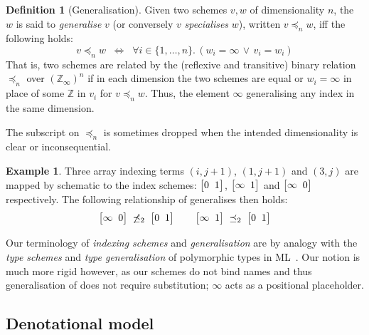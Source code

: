 \documentclass[9pt]{sigplanconf}
\newcounter{block}
\theoremstyle{definition}
\newtheorem{example}[block]{Example}
\newtheorem{definition}[block]{Definition}
\newcommand{\vtwoh}[2]{\setlength{\arraycolsep}{0em}
\left[\begin{array}{cc}#1 \; & \; #2\end{array}\right]}
\begin{document}
\begin{definition}[Generalisation]
Given two schemes $v, w$ of dimensionality $n$,
the $w$ is said to \emph{generalise} $v$ 
(or conversely $v$ \emph{specialises} $w$),
written $v \preceq_n w$, iff the following holds:
\[
v \preceq_n w \;\; \Leftrightarrow  \;\;
  \forall i\!\in\!\{ 1, \ldots, n \} . \, (w_i = \infty \, \vee \, v_i = w_i)
\]
That is, two schemes are related by the (reflexive and transitive) binary relation
$\preceq_n$ over $(\mathbb{Z}_{\infty})^n$ if in each dimension
the two schemes are equal or $w_i = \infty$ 
in place of some $\mathbb{Z}$ in $v_i$ for $v \preceq_n w$. 
Thus, the element $\infty$ 
generalising any index in the same dimension. 

The subscript on $\preceq_n$ is sometimes dropped when the
intended dimensionality is clear or inconsequential.
\end{definition}
 
 

\begin{example}
Three array indexing terms
$(i, j+1)$, $(1, j+1)$ and $(3, j)$
are mapped by \textsf{schematic} to the 
index schemes: $\vtwoh{0}{1}$, $\vtwoh{\infty}{1}$
and $\vtwoh{\infty}{0}$ respectively. The following
relationship of generalises then holds:
\begin{equation*}
\vtwoh{\infty}{0} \; \not\preceq_2 \; \vtwoh{0}{1} 
\qquad
\vtwoh{\infty}{1} \; \preceq_2 \; \vtwoh{0}{1} 
\end{equation*}
\end{example}
\noindent
Our terminology of \emph{indexing schemes} and
\emph{generalisation} are by analogy
with the \emph{type schemes} and \emph{type generalisation} of
polymorphic types in ML~\cite{milner1978theory}. Our notion is
much more rigid however, as our schemes do not bind names
and thus generalisation of does not require substitution; $\infty$ acts
as a positional placeholder.


\subsection{Denotational model}
\end{document}
